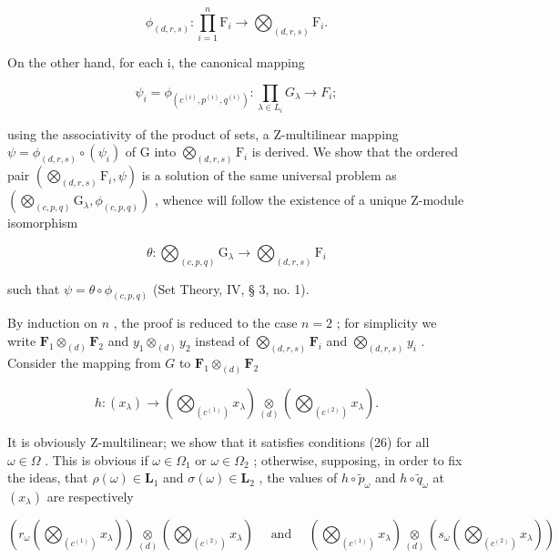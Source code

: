 \[
\phi_ {(d, r, s)}: \prod_ {i = 1} ^ {n} \mathrm{F} _ {i} \rightarrow \bigotimes_ {(d, r, s)} \mathrm{F} _ {i}.
\]

On the other hand, for each i, the canonical mapping

\[
\psi_ {i} = \phi_ {(c ^ {(i)}, p ^ {(i)}, q ^ {(i)})}: \prod_ {\lambda \in L _ {i}} G _ {\lambda} \rightarrow F _ {i};
\]

using the associativity of the product of sets, a Z-multilinear mapping \(\psi = \phi_{(d,r,s)}\circ (\psi_i)\) of G into \(\bigotimes_{(d,r,s)}\mathrm{F}_i\) is derived. We show that the ordered pair \(\left(\bigotimes_{(d,r,s)}\mathrm{F}_i,\psi\right)\) is a solution of the same universal problem as \(\left(\bigotimes_{(c,p,q)}\mathrm{G}_{\lambda},\phi_{(c,p,q)}\right)\) , whence will follow the existence of a unique Z-module isomorphism

\[
\theta \colon \bigotimes_ {(c, p, q)} \mathrm{G} _ {\lambda} \rightarrow \bigotimes_ {(d, r, s)} \mathrm{F} _ {i}
\]

such that \(\psi = \theta \circ \phi_{(c,p,q)}\) (Set Theory, IV, § 3, no. 1).

By induction on \(n\) , the proof is reduced to the case \(n = 2\) ; for simplicity we write \(\mathbf{F}_1 \otimes_{(d)} \mathbf{F}_2\) and \(y_1 \otimes_{(d)} y_2\) instead of \(\bigotimes_{(d, r, s)} \mathbf{F}_i\) and \(\bigotimes_{(d, r, s)} y_i\) . Consider the mapping from \(G\) to \(\mathbf{F}_1 \otimes_{(d)} \mathbf{F}_2\)

\[
h \colon (x _ {\lambda}) \to \left(\bigotimes_ {(c ^ {(1)})} x _ {\lambda}\right) \underset {(d)} {\otimes} \left(\bigotimes_ {(c ^ {(2)})} x _ {\lambda}\right).
\]

It is obviously Z-multilinear; we show that it satisfies conditions (26) for all \(\omega\in\Omega\) . This is obvious if \(\omega\in\Omega_{1}\) or \(\omega\in\Omega_{2}\) ; otherwise, supposing, in order to fix the ideas, that \(\rho(\omega)\in\mathbf{L}_{1}\) and \(\sigma(\omega)\in\mathbf{L}_{2}\) , the values of \(h\circ\tilde{p}_{\omega}\) and \(h\circ\tilde{q}_{\omega}\) at \((x_{\lambda})\) are respectively

\[
\left(r _ {\omega} \left(\bigotimes_ {(c ^ {(1)})} x _ {\lambda}\right)\right) \underset {(d)} {\otimes} \left(\bigotimes_ {(c ^ {(2)})} x _ {\lambda}\right) \quad \text { and } \quad \left(\bigotimes_ {(c ^ {(1)})} x _ {\lambda}\right) \underset {(d)} {\otimes} \left(s _ {\omega} \left(\bigotimes_ {(c ^ {(2)})} x _ {\lambda}\right)\right)
\]

